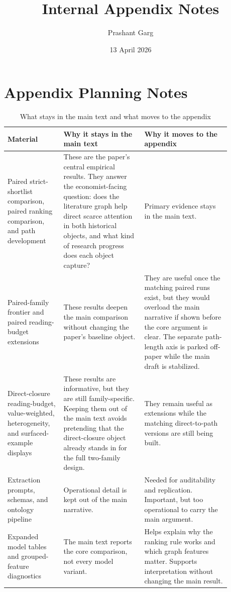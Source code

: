 \documentclass[11pt]{article}
\title{\textbf{Internal Appendix Notes}}
\author{Prashant Garg}
\date{13 April 2026}
\begin{document}
\maketitle

\section{Appendix Planning Notes}

\begin{table}[h]
  \caption{What stays in the main text and what moves to the appendix}
  \label{tab:appendix-guide}
  \centering
  \small
  \begin{tabular}{L{0.22\linewidth}L{0.32\linewidth}L{0.34\linewidth}}
    \toprule
    Material & Why it stays in the main text & Why it moves to the appendix \\
    \midrule
    Paired strict-shortlist comparison, paired ranking comparison, and path development & These are the paper's central empirical results. They answer the economist-facing question: does the literature graph help direct scarce attention in both historical objects, and what kind of research progress does each object capture? & Primary evidence stays in the main text. \\
    Paired-family frontier and paired reading-budget extensions & These results deepen the main comparison without changing the paper's baseline object. & They are useful once the matching paired runs exist, but they would overload the main narrative if shown before the core argument is clear. The separate path-length axis is parked off-paper while the main draft is stabilized. \\
    Direct-closure reading-budget, value-weighted, heterogeneity, and surfaced-example displays & These results are informative, but they are still family-specific. Keeping them out of the main text avoids pretending that the direct-closure object already stands in for the full two-family design. & They remain useful as extensions while the matching direct-to-path versions are still being built. \\
    Extraction prompts, schemas, and ontology pipeline & Operational detail is kept out of the main narrative. & Needed for auditability and replication. Important, but too operational to carry the main argument. \\
    Expanded model tables and grouped-feature diagnostics & The main text reports the core comparison, not every model variant. & Helps explain why the ranking rule works and which graph features matter. Supports interpretation without changing the main result. \\

\end{tabular}
\end{table}
\end{document}
